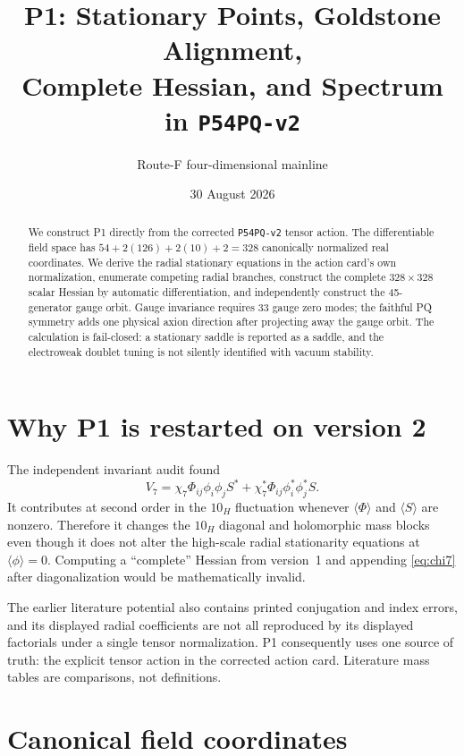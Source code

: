 \documentclass[11pt]{article}
\title{P1: Stationary Points, Goldstone Alignment,\\
Complete Hessian, and Spectrum in \texttt{P54PQ-v2}}
\author{Route-F four-dimensional mainline}
\date{30 August 2026}
\begin{document}
\maketitle

\begin{abstract}
We construct P1 directly from the corrected \texttt{P54PQ-v2} tensor
action.  The differentiable field space has
$54+2(126)+2(10)+2=328$ canonically normalized real coordinates.  We derive
the radial stationary equations in the action card's own normalization,
enumerate competing radial branches, construct the complete
$328\times328$ scalar Hessian by automatic differentiation, and independently
construct the 45-generator gauge orbit.  Gauge invariance requires 33 gauge
zero modes; the faithful PQ symmetry adds one physical axion direction after
projecting away the gauge orbit.  The calculation is fail-closed: a
stationary saddle is reported as a saddle, and the electroweak doublet tuning
is not silently identified with vacuum stability.
\end{abstract}

\section{Why P1 is restarted on version 2}

The independent invariant audit found
\begin{equation}
 V_7=\chi_7\Phi_{ij}\phi_i\phi_jS^*+\chi_7^*\Phi_{ij}\phi_i^*\phi_j^*S.
 \label{eq:chi7}
\end{equation}
It contributes at second order in the $10_H$ fluctuation whenever
$\langle\Phi\rangle$ and $\langle S\rangle$ are nonzero.  Therefore it changes
the $10_H$ diagonal and holomorphic mass blocks even though it does not alter
the high-scale radial stationarity equations at $\langle\phi\rangle=0$.
Computing a ``complete'' Hessian from version~1 and appending \eqref{eq:chi7}
after diagonalization would be mathematically invalid.

The earlier literature potential also contains printed conjugation and index
errors, and its displayed radial coefficients are not all reproduced by its
displayed factorials under a single tensor normalization.  P1 consequently
uses one source of truth: the explicit tensor action in the corrected action
card.  Literature mass tables are comparisons, not definitions.

\section{Canonical field coordinates}
\end{document}
